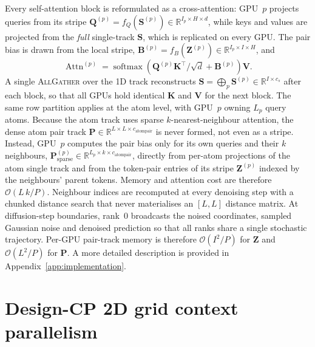 Every self-attention block is reformulated as a cross-attention: GPU~$p$ projects
queries from its stripe $\mathbf{Q}^{(p)}=f_Q(\mathbf{S}^{(p)})\in
\mathbb{R}^{I_p\times H\times d}$, while keys and values are projected from the
\emph{full} single-track $\mathbf{S}$, which is replicated on every GPU. The pair
bias is drawn from the local stripe, $\mathbf{B}^{(p)}=f_B(\mathbf{Z}^{(p)})\in
\mathbb{R}^{I_p\times I\times H}$, and
%
\begin{equation}
  \operatorname{Attn}^{(p)} = \operatorname{softmax}\!\left(
    \mathbf{Q}^{(p)} \mathbf{K}^\top/\sqrt{d} + \mathbf{B}^{(p)}
  \right) \mathbf{V}.
  \label{eq:cross-attn}
\end{equation}
%
A single \textsc{AllGather} over the 1D track reconstructs
$\mathbf{S}=\bigoplus_{p}\mathbf{S}^{(p)}\in\mathbb{R}^{I\times c_s}$ after each
block, so that all GPUs hold identical $\mathbf{K}$ and $\mathbf{V}$ for the next
block. The same row partition applies at the atom level, with GPU~$p$ owning $L_p$
query atoms. Because the atom track uses sparse $k$-nearest-neighbour attention,
the dense atom pair track $\mathbf{P}\in\mathbb{R}^{L\times L\times c_\text{atompair}}$
is never formed, not even as a stripe. Instead, GPU~$p$ computes the pair bias
only for its own queries and their $k$ neighbours,
$\mathbf{P}^{(p)}_\text{sparse}\in\mathbb{R}^{L_p\times k\times c_\text{atompair}}$,
directly from per-atom projections of the atom single track and from the
token-pair entries of its stripe $\mathbf{Z}^{(p)}$ indexed by the neighbours'
parent tokens. Memory and attention cost are therefore $\mathcal{O}(L\,k/P)$.
Neighbour indices are recomputed at every denoising step with a chunked distance
search that never materialises an $[L,L]$ distance matrix. At diffusion-step boundaries,
rank~$0$ broadcasts the noised coordinates, sampled Gaussian noise and denoised
prediction so that all ranks share a single stochastic trajectory. Per-GPU
pair-track memory is therefore $\mathcal{O}(I^{2}/P)$ for $\mathbf{Z}$ and
$\mathcal{O}(L^{2}/P)$ for $\mathbf{P}$. A more detailed description is provided in
Appendix~\ref{app:implementation}.

\section{Design-CP 2D grid context parallelism}
\label{sec:cp-2d}


